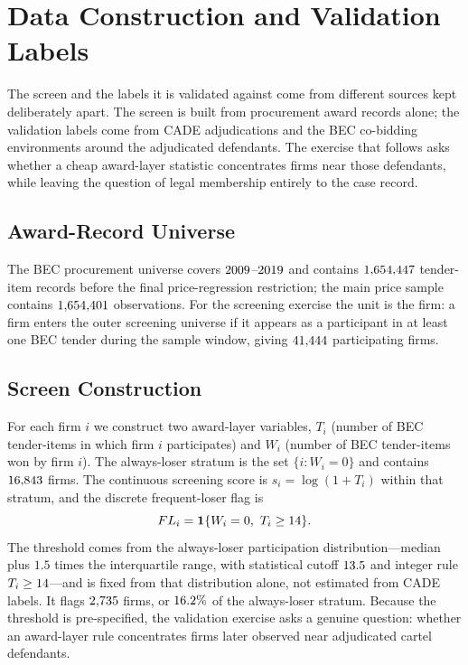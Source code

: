\section{Data Construction and Validation Labels}
\label{app:data_labels_submission}

The screen and the labels it is validated against come from different
sources kept deliberately apart. The screen is built from procurement
award records alone; the validation labels come from CADE adjudications
and the BEC co-bidding environments around the adjudicated defendants.
The exercise that follows asks whether a cheap award-layer statistic
concentrates firms near those defendants, while leaving the question of
legal membership entirely to the case record.

\subsection{Award-Record Universe}
\label{app:award_universe_submission}

The BEC procurement universe covers $2009$--$2019$
and contains $1{,}654{,}447$ tender-item records before the
final price-regression restriction; the main price sample contains
$1{,}654{,}401$ observations. For the screening exercise the unit is
the firm: a firm enters the outer screening universe if it appears
as a participant in at least one BEC tender during the sample
window, giving $41{,}444$ participating firms.

\subsection{Screen Construction}
\label{app:screen_construction_submission}

For each firm $i$ we construct two award-layer variables,
$T_i$ (number of BEC tender-items in which firm $i$ participates)
and $W_i$ (number of BEC tender-items won by firm $i$). The
always-loser stratum is the set $\{i:W_i=0\}$ and contains
$16{,}843$ firms. The continuous screening score is
$s_i=\log(1+T_i)$ within that stratum, and the discrete
frequent-loser flag is
\[
  FL_i=\mathbf{1}\{W_i=0,\ T_i\geq\valThreshold\}.
\]
The threshold comes from the always-loser participation
distribution---median plus $1.5$ times the interquartile range,
with statistical cutoff $13.5$ and integer rule
$T_i\geq14$---and is fixed from that distribution alone,
not estimated from CADE labels. It flags $2{,}735$ firms, or
$16.2\%$ of the always-loser stratum. Because the threshold
is pre-specified, the validation exercise asks a genuine question:
whether an award-layer rule concentrates firms later observed near
adjudicated cartel defendants.

